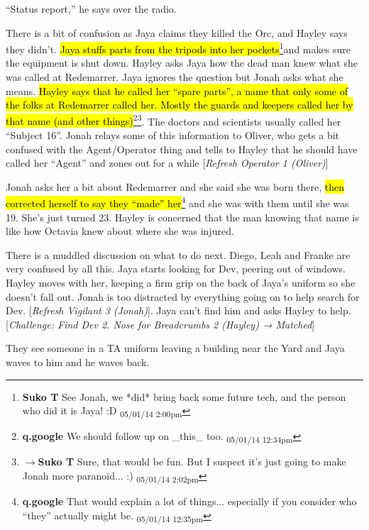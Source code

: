 ``Status report,'' he says over the radio.  



There is a bit of confusion as Jaya claims they killed the Orc, and Hayley says they didn't.  \hl{Jaya stuffs parts from the tripods into her pockets}\footnote{\textbf{Suko T }See Jonah, we *did* bring back some future tech, and the person who did it is Jaya! :D \textsubscript{05/01/14 2:00pm}}and makes sure the equipment is shut down.  Hayley asks Jaya how the dead man knew what she was called at Redemarrer.  Jaya ignores the question but Jonah asks what she means.  \hl{Hayley says that he called her ``spare parts'', a name that only some of the folks at Redemarrer called her.  Mostly the guards and keepers called her by that name (and other things)}\footnote{\textbf{q.google }We should follow up on \_this\_ too. \textsubscript{05/01/14 12:34pm}}\footnote{$\rightarrow$\textbf{Suko T }Sure, that would be fun.  But I suspect it's just going to make Jonah more paranoid... :) \textsubscript{05/01/14 2:02pm}}.  The doctors and scientists usually called her ``Subject 16''.  Jonah relays some of this information to Oliver, who gets a bit confused with the Agent/Operator thing and tells to Hayley that he should have called her ``Agent'' and zones out for a while {[}\textit{Refresh Operator 1 (Oliver)}{]}



Jonah asks her a bit about Redemarrer and she said she was born there, \hl{then corrected herself to say they ``made'' her}\footnote{\textbf{q.google }That would explain a lot of things... especially if you consider who ``they'' actually might be. \textsubscript{05/01/14 12:35pm}} and she was with them until she was 19.  She's just turned 23.   Hayley is concerned that the man knowing that name is like how Octavia knew about where she was injured. 



There is a muddled discussion on what to do next.  Diego, Leah and Franke are very confused by all this.  Jaya starts looking for Dev, peering out of windows.  Hayley moves with her, keeping a firm grip on the back of Jaya's uniform so she doesn't fall out.  Jonah is too distracted by everything going on to help search for Dev. {[}\textit{Refresh Vigilant 3 (Jonah)}{]}.  Jaya can't find him and asks Hayley to help.  {[}\textit{Challenge: Find Dev 2. Nose for Breadcrumbs 2 (Hayley) → Matched}{]}



They see someone in a TA uniform leaving a building near the Yard and Jaya waves to him and he waves back.



